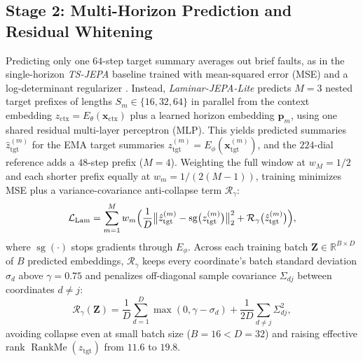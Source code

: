 \documentclass[journal]{IEEEtran}
\begin{document}
\subsection{Stage 2: Multi-Horizon Prediction and Residual Whitening}
\label{subsec:triad_formulations}
Predicting only one $64$-step target summary averages out brief faults, as in the single-horizon \emph{TS-JEPA} baseline trained with mean-squared error (MSE) and a log-determinant regularizer \cite{bardes2021vicreg}. Instead, \emph{Laminar-JEPA-Lite} predicts $M=3$ nested target prefixes of lengths $S_m \in \{16, 32, 64\}$ in parallel from the context embedding $z_{\text{ctx}} = E_\theta(\mathbf{x}_{\text{ctx}})$ plus a learned horizon embedding $\mathbf{p}_m$, using one shared residual multi-layer perceptron (MLP). This yields predicted summaries $\hat{z}_{\text{tgt}}^{(m)}$ for the EMA target summaries $z_{\text{tgt}}^{(m)} = E_\phi(\mathbf{x}_{\text{tgt}}^{(m)})$, and the $224$-dial reference adds a $48$-step prefix ($M=4$). Weighting the full window at $w_M=1/2$ and each shorter prefix equally at $w_m=1/(2(M-1))$, training minimizes MSE plus a variance-covariance anti-collapse term $\mathcal{R}_\gamma$:
\begin{equation}
    \mathcal{L}_{\text{Lam}} = \sum_{m=1}^M w_m \Bigl(\frac{1}{D}\bigl\|\hat{z}_{\text{tgt}}^{(m)} - \operatorname{sg}\bigl(z_{\text{tgt}}^{(m)}\bigr)\bigr\|_2^2 + \mathcal{R}_\gamma\bigl(\hat{z}_{\text{tgt}}^{(m)}\bigr)\Bigr),
    \label{eq:laminar_loss}
\end{equation}
where $\operatorname{sg}(\cdot)$ stops gradients through $E_\phi$. Across each training batch $\mathbf{Z} \in \mathbb{R}^{B \times D}$ of $B$ predicted embeddings, $\mathcal{R}_\gamma$ keeps every coordinate's batch standard deviation $\sigma_d$ above $\gamma=0.75$ and penalizes off-diagonal sample covariance $\Sigma_{dj}$ between coordinates $d \neq j$:
\begin{equation}
    \mathcal{R}_\gamma(\mathbf{Z}) = \frac{1}{D}\sum_{d=1}^D \max(0, \gamma - \sigma_d) + \frac{1}{2D}\sum_{d\neq j} \Sigma_{dj}^2 ,
\end{equation}
avoiding collapse even at small batch size ($B=16 < D=32$) and raising effective rank $\operatorname{RankMe}(z_{\text{tgt}})$ \cite{garrido2023rankme} from $11.6$ to $19.8$.
\end{document}
